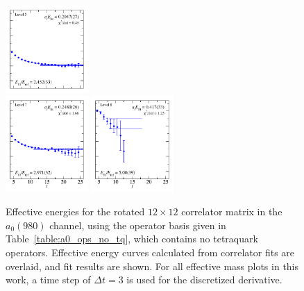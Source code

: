 \begin{figure}
  \includegraphics[width=0.28\textwidth]{figures/spectrum_a1gm/no_tq/fits/fit_4.pdf}\\
  \includegraphics[width=0.28\textwidth]{figures/spectrum_a1gm/no_tq/fits/fit_7.pdf}
  \includegraphics[width=0.28\textwidth]{figures/spectrum_a1gm/no_tq/fits/fit_8.pdf}\\
  \caption[Effective energies for the rotated $12\times 12$ correlator matrix in the $a_0(980)$ channel, using the operator basis given in Table~\ref{table:a0_ops_no_tq}, which contains no tetraquark operators.]{Effective energies for the rotated $12\times 12$ correlator matrix in the $a_0(980)$ channel, using the operator basis given in Table~\ref{table:a0_ops_no_tq}, which contains no tetraquark operators. Effective energy curves calculated from correlator fits are overlaid, and fit results are shown. For all effective mass plots in this work, a time step of $\Delta t = 3$ is used for the discretized derivative.}
  \label{fig:a0_no_tq_grid}
\end{figure}


